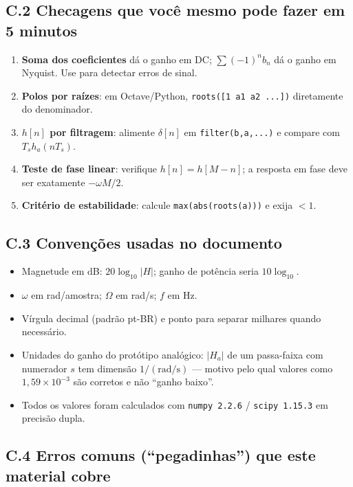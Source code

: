 \subsection*{C.2 Checagens que você mesmo pode fazer em 5 minutos}

\begin{enumerate}
  \item \textbf{Soma dos coeficientes} dá o ganho em DC;
        $\sum(-1)^nb_n$ dá o ganho em Nyquist. Use para detectar erros de
        sinal.
  \item \textbf{Polos por raízes}: em Octave/Python,
        \texttt{roots([1 a1 a2 ...])} diretamente do denominador.
  \item \textbf{$h[n]$ por filtragem}: alimente $\delta[n]$ em
        \texttt{filter(b,a,...)} e compare com $T_sh_a(nT_s)$.
  \item \textbf{Teste de fase linear}: verifique $h[n]=h[M-n]$; a resposta em
        fase deve ser exatamente $-\omega M/2$.
  \item \textbf{Critério de estabilidade}: calcule \texttt{max(abs(roots(a)))}
        e exija $<1$.
\end{enumerate}

\subsection*{C.3 Convenções usadas no documento}

\begin{itemize}
  \item Magnetude em dB: $20\log_{10}|H|$; ganho de potência seria
        $10\log_{10}$.
  \item $\omega$ em rad/amostra; $\Omega$ em rad/s; $f$ em Hz.
  \item Vírgula decimal (padrão pt-BR) e ponto para separar milhares quando
        necessário.
  \item Unidades do ganho do protótipo analógico: $|H_a|$ de um passa-faixa
        com numerador $s$ tem dimensão $1/(\text{rad/s})$ — motivo pelo qual
        valores como $1{,}59\times10^{-3}$ são corretos e não ``ganho
        baixo''.
  \item Todos os valores foram calculados com \texttt{numpy 2.2.6} /
        \texttt{scipy 1.15.3} em precisão dupla.
\end{itemize}

\subsection*{C.4 Erros comuns (``pegadinhas'') que este material cobre}

